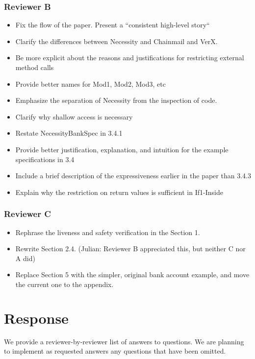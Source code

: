 \documentclass[11pt]{amsart}
\begin{document}
\subsubsection*{Reviewer B}
\begin{itemize}
\item Fix the flow of the paper. Present a ``consistent high-level story``
\item Clarify the differences between Necessity and Chainmail and VerX.
\item Be more explicit about the reasons and justifications for restricting external method calls
\item Provide better names for Mod1, Mod2, Mod3, etc
\item Emphasize the separation of Necessity from the inspection of code.
\item Clarify why shallow access is necessary
\item Restate NecessityBankSpec in 3.4.1
\item Provide better justification, explanation, and intuition for the example specifications in 3.4
\item Include a brief description of the expressiveness earlier in the paper than 3.4.3
\item Explain why the restriction on return values is sufficient in If1-Inside
\end{itemize}

\subsubsection*{Reviewer C}
\begin{itemize}
\item Rephrase the liveness and safety verification in the Section 1.
\item Rewrite Section 2.4. (Julian: Reviewer B appreciated this, but neither C nor A did)
\item Replace Section 5 with the simpler, original bank account example, and move the current one to the appendix.
\end{itemize}


  
\section{Response} We provide a reviewer-by-reviewer list of answers to questions. We are planning to implement as requested answers any questions that have been omitted.
  
\end{document}
